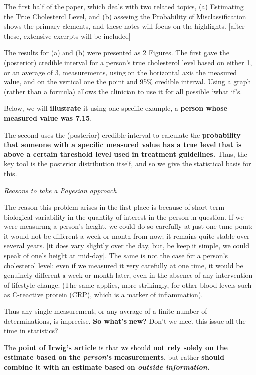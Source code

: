 \documentclass[]{book}
\begin{document}
The first half of the paper, which deals with two related topics, (a) Estimating the True Cholesterol Level, and (b) assesing the Probability of Misclassification shows the primary elements, and these notes will focus on the highlights. {[}after these, extensive excerpts will be included{]}

The results for (a) and (b) were presented as 2 Figures. The first gave the (posterior) credible interval for a person's true cholesterol level based on either 1, or an average of 3, measurements, using on the horizontal axis the measured value, and on the vertical one the point and 95\% credible interval. Using a graph (rather than a formula) allows the clinician to use it for all possible `what if's.

Below, we will \textbf{illustrate} it using one specific example, a \textbf{person whose measured value was 7.15}.

The second uses the (posterior) credible interval to calculate the \textbf{probability that someone with a specific measured value has a true level that is above a certain threshold level used in treatment guidelines.}
Thus, the key tool is the posterior distribution itself, and so we give the statistical basis for this.

\emph{Reasons to take a Bayesian approach}

The reason this problem arises in the first place is because of short term biological variability in the quantity of interest in the person in question. If we were measuring a person's height, we could do so carefully at just one time-point: it would not be different a week or month from now; it remains quite stable over several years. {[}it does vary slightly over the day, but, be keep it simple, we could speak of one's height at mid-day{]}. The same is not the case for a person's cholesterol level: even if we measured it very carefully at one time, it would be genuinely different a week or month later, even in the absence of any intervention of lifestyle change. (The same applies, more strikingly, for other blood levels such as C-reactive protein (CRP), which is a marker of inflammation).

Thus any single measurement, or any average of a finite number of determinations, is imprecise. \textbf{So what's new?} Don't we meet this issue all the time in statistics?

The \textbf{point of Irwig's article} is that we should \textbf{not rely solely on the estimate based on the \emph{person}'s measurements}, but rather \textbf{should combine it with an
estimate based on \emph{outside information}.}
\end{document}
